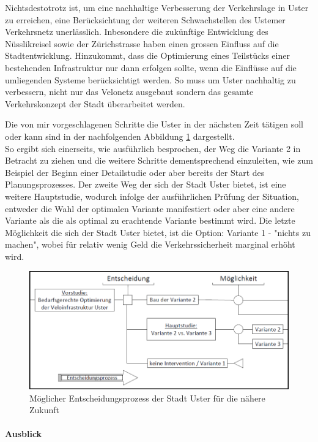 Nichtsdestotrotz ist, um eine nachhaltige Verbesserung der Verkehrslage in Uster zu erreichen, eine Berücksichtung der weiteren Schwachstellen des Ustemer Verkehrsnetz unerlässlich. Inbesondere die zukünftige Entwicklung des Nüsslikreisel sowie der Zürichstrasse haben einen grossen Einfluss auf die Stadtentwicklung. Hinzukommt, dass die Optimierung eines Teilstücks einer bestehenden Infrastruktur nur dann erfolgen sollte, wenn die Einflüsse auf die umliegenden Systeme berücksichtigt werden. So muss um Uster nachhaltig zu verbessern, nicht nur das Velonetz ausgebaut sondern das gesamte Verkehrskonzept der Stadt überarbeitet werden. 

Die von mir vorgeschlagenen Schritte die Uster in der nächsten Zeit tätigen soll oder kann sind in der nachfolgenden Abbildung \ref{img:UsterFuture} dargestellt. \\
So ergibt sich einerseits, wie ausführlich besprochen, der Weg die Variante 2 in Betracht zu ziehen und die weitere Schritte dementsprechend einzuleiten, wie zum Beispiel der Beginn einer Detailstudie oder aber bereits der Start des Planungsprozesses. Der zweite Weg der sich der Stadt Uster bietet, ist eine weitere Hauptstudie, wodurch infolge der ausführlichen Prüfung der Situation, entweder die Wahl der optimalen Variante manifestiert oder aber eine andere Variante als die als optimal zu erachtende Variante bestimmt wird. Die letzte Möglichkeit die sich der Stadt Uster bietet, ist die Option: Variante 1 - "nichts zu machen", wobei für relativ wenig Geld die Verkehrssicherheit marginal erhöht wird. 

\begin{figure}[h!]
	\centering
	\includegraphics[width=.6\textwidth]{figures/f-07-01-EntscheidungsprozessUster}
	\caption[Entscheidungsprozess der Stadt Uster]{Möglicher Entscheidungsprozess der Stadt Uster für die nähere Zukunft}
	\label{img:UsterFuture}
\end{figure} 

\pagebreak

\paragraph{Ausblick}

